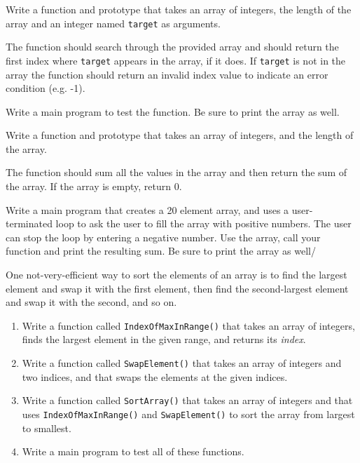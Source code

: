 \begin{exercise}
Write a function and prototype that takes an array of integers, the length of the array and an integer named
{\tt target} as arguments. 

The function should search through the provided array and should return the first index where
{\tt target} appears in the array, if it does. If {\tt target} is not in the array the function should 
return an invalid index value to indicate an error condition  (e.g.  -1).

Write a main program to test the function. Be sure to print the array as well.
\end{exercise}


\begin{exercise}
	Write a function and prototype that takes an array of integers, and the length of the array.
	
	The function should sum all the values in the array and then return the sum of the array. If the array is empty, return 0.
	
	Write a main program that creates a 20 element array, and uses a user-terminated loop to ask the user to fill the array with positive numbers. The user can stop the loop by entering a negative number. Use the array, call your function and print the resulting sum. Be sure to print the array as well/
\end{exercise}

\begin{exercise}

One not-very-efficient way to sort the elements of an array
is to find the largest element and swap it with the first
element, then find the second-largest element and swap it with
the second, and so on.

\begin{enumerate}

\item Write a function called {\tt IndexOfMaxInRange()} that 
takes an array of integers, finds the
largest element in the given range, and returns its {\em index}.

\item Write a function called {\tt SwapElement()} that takes an
array of integers and two indices, and that swaps the elements
at the given indices.

\item Write a function called {\tt SortArray()} that takes an array of
integers and that uses {\tt IndexOfMaxInRange()} and {\tt SwapElement()}
to sort the array from largest to smallest.

\item Write a main program to test all of these functions. 

\end{enumerate}
\end{exercise}



